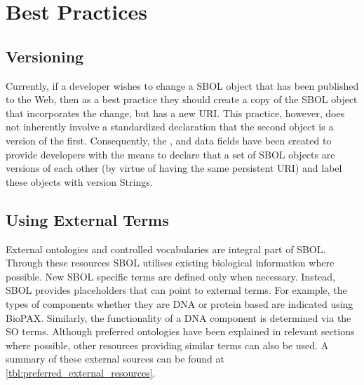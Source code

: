 \section{Best Practices}
\label{sec:bestpractices}
\subsection{Versioning}
Currently, if a developer wishes to change a SBOL object that has been published to the Web, then as a best practice they should create a copy of the SBOL object that incorporates the change, but has a new URI. This practice, however, does not inherently involve a standardized declaration that the second object is a version of the first. Consequently, the , and  data fields have been created to provide developers with the means to declare that a set of SBOL objects are versions of each other (by virtue of having the same persistent URI) and label these objects with version Strings.


\subsection{Using External Terms}
External ontologies and controlled vocabularies are integral part of SBOL. Through these resources SBOL utilises existing biological information where possible. New SBOL specific terms are defined only when necessary. Instead, SBOL provides placeholders that can point to external terms. For example, the types of components whether they are DNA or protein based are indicated using BioPAX. Similarly,  the functionality of a DNA component is determined via the SO terms. Although preferred ontologies have been explained in relevant sections where possible, other resources providing similar terms can also be used. A summary of these external sources can be found at \ref{tbl:preferred_external_resources}.


